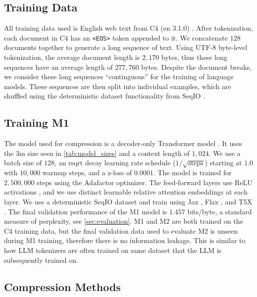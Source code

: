 \subsection{Training Data}

All training data used is English web text from C4 (en 3.1.0) \cite{CRaffel20}. After tokenization, each document in C4 has an \texttt{<EOS>} token appended to it. We concatenate $128$ documents together to generate a long sequence of text. Using UTF-8 byte-level tokenization, the average document length is $2{,}170$ bytes, thus these long sequences have an average length of $277{,}760$ bytes. Despite the document breaks, we consider these long sequences ``continguous'' for the training of language models. These sequences are then split into individual examples, which are shuffled using the deterministic dataset functionality from SeqIO \cite{roberts-etal-23-scaling}.

\subsection{Training M1}

The model used for compression is a decoder-only Transformer model \cite{vaswaniAttentionAllYou2017}. It uses the $3$m size seen in \ref{tab:model_sizes} and a context length of $1{,}024$. We use a batch size of $128$, an rsqrt decay learning rate schedule ($1 / \sqrt{\text{steps}}$) starting at $1.0$ with $10{,}000$ warmup steps, and a z-loss of $0.0001$. The model is trained for $2{,}500{,}000$ steps using the Adafactor \cite{shazeerAdafactorAdaptiveLearning2018} optimizer. The feed-forward layers use ReLU activations \cite{nairRectifiedLinearUnits2010,fukushimaCognitronSelfOrganizingMultilayered1975}, and we use distinct learnable relative attention embeddings \cite{shawSelfAttentionRelativePosition2018} at each layer. We use a deterministic SeqIO dataset and train using Jax \cite{jax2018github}, Flax \cite{flax2020github}, and T5X \cite{roberts-etal-23-scaling}. The final validation performance of the M1 model is $1.457$ bits/byte, a standard measure of perplexity, see \ref{sec:evaluation}. M1 and M2 are both trained on the C4 training data, but the final validation data used to evaluate M2 is unseen during M1 training, therefore there is no information leakage. This is similar to how LLM tokenizers are often trained on same dataset that the LLM is subsequently trained on.

\subsection{Compression Methods}
\label{sec:compression_methods}

